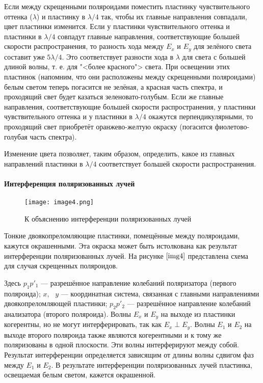 \documentclass[a4paper,12pt]{article} %
\begin{document}
Если между скрещенными поляроидами поместить пластинку чувствительного оттенка ($\lambda$) и пластинку в $\lambda/4$ так, чтобы их главные направления совпадали, цвет пластинки изменится. Если у пластинки чувствительного оттенка и пластинки в $\lambda/4$ совпадут главные направления, соответствующие большей скорости распространения, то разность хода между $E_x$ и $E_y$ для зелёного света составит уже $5\lambda/4$. Это соответствует разности хода в $\lambda$ для света с большей длиной волны, т. е. для "<более красного"> света. При освещении этих пластинок (напомним, что они расположены между скрещенными поляроидами) белым светом теперь погасится не зелёная, а красная часть спектра, и проходящий свет будет казаться зеленовато-голубым. Если же главные направления, соответствующие большей скорости распространения, у пластинки чувствительного оттенка и у пластинки в $\lambda/4$ окажутся перпендикулярными, то проходящий свет приобретёт оранжево-желтую окраску (погасится фиолетово-голубая часть спектра).

Изменение цвета позволяет, таким образом, определить, какое из главных направлений пластинки в $\lambda/4$ соответствует большей скорости распространения.

\paragraph{Интерференция поляризованных лучей}

\begin{wrapfigure}{r}{0.35\linewidth}
    \texttt{[image: image4.png]}
    \caption{К объяснению интерференции поляризованных лучей}
    \label{img4}
\end{wrapfigure}


Тонкие двоякопреломляющие пластинки, помещённые между поляроидами, кажутся окрашенными. Эта окраска может быть истолкована как результат интерференции поляризованных лучей. На рисунке $\ref{img4}$ представлена схема для случая скрещенных поляроидов.

Здесь $p_1p'_1$ --- разрешённое направление колебаний поляризатора (первого поляроида); $x,\text{ }y$ --- координатная система, связанная с главными направлениями двоякопреломляющей пластинки; $p_2p'_2$ --- разрешённое направление колебаний анализатора (второго поляроида). Волны $E_x$ и $E_y$ на выходе из пластинки когерентны, но не могут интерферировать, так как $E_x\perp E_y$. Волны $E_1$ и $E_2$ на выходе второго поляроида также являются когерентными и к тому же поляризованы в одной плоскости. Эти волны интерферируют между собой. Результат интерференции определяется зависящим от длины волны сдвигом фаз между $E_1$ и $E_2$. В результате интерференции поляризованных лучей пластинка, освещаемая белым светом, кажется окрашенной.
\end{document}
